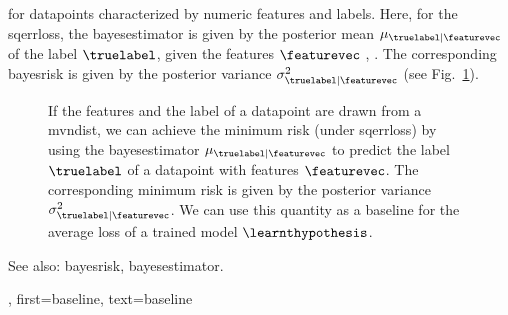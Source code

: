 {{		for \glspl{datapoint} characterized by numeric \glspl{feature} and \glspl{label}.
		Here, for the \gls{sqerrloss}, the \gls{bayesestimator} is given by the \gls{posterior} 
		\gls{mean} $\mu_{\truelabel|\featurevec}$ of the \gls{label} $\truelabel$, given the 
		\glspl{feature} $\featurevec$ \cite{GrayProbBook}, \cite{LC}. The corresponding \gls{bayesrisk} 
		is given by the \gls{posterior} \gls{variance} 
		$\sigma^{2}_{\truelabel|\featurevec}$ (see Fig.\ \ref{fig_post_baseline_dict}).
		\begin{figure}[H]
		\begin{center}
		\end{center}
		\caption{If the \glspl{feature} and the \gls{label} of a \gls{datapoint} are drawn 
			from a \gls{mvndist}, we can achieve the \gls{minimum} \gls{risk} (under \gls{sqerrloss}) 
			by using the \gls{bayesestimator} $\mu_{\truelabel|\featurevec}$ 
			to predict the \gls{label} $\truelabel$ of a \gls{datapoint} with \glspl{feature} $\featurevec$. The corresponding 
			\gls{minimum} \gls{risk} is given by the \gls{posterior} \gls{variance} $\sigma^{2}_{\truelabel|\featurevec}$. We can use 
			this quantity as a baseline for the average \gls{loss} of a trained \gls{model} $\learnthypothesis$. \label{fig_post_baseline_dict}}
		\end{figure}
		See also: \gls{bayesrisk}, \gls{bayesestimator}.},
    first={baseline},
    text={baseline}
}

